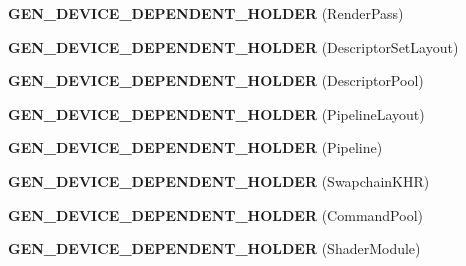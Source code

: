\begin{DoxyCompactItemize}
\item 
\mbox{\label{namespaceblaze_1_1vkw_aa8cd516cb33150db17cf3419e3564eb3}} 
{\bfseries G\+E\+N\+\_\+\+D\+E\+V\+I\+C\+E\+\_\+\+D\+E\+P\+E\+N\+D\+E\+N\+T\+\_\+\+H\+O\+L\+D\+ER} (Render\+Pass)
\item 
\mbox{\label{namespaceblaze_1_1vkw_a899f6acf3c1fea92c26320f7f0cbfdb0}} 
{\bfseries G\+E\+N\+\_\+\+D\+E\+V\+I\+C\+E\+\_\+\+D\+E\+P\+E\+N\+D\+E\+N\+T\+\_\+\+H\+O\+L\+D\+ER} (Descriptor\+Set\+Layout)
\item 
\mbox{\label{namespaceblaze_1_1vkw_a64c0355438819705ffd104379845f56d}} 
{\bfseries G\+E\+N\+\_\+\+D\+E\+V\+I\+C\+E\+\_\+\+D\+E\+P\+E\+N\+D\+E\+N\+T\+\_\+\+H\+O\+L\+D\+ER} (Descriptor\+Pool)
\item 
\mbox{\label{namespaceblaze_1_1vkw_a715373a505f77a1ed57492088afcb7d2}} 
{\bfseries G\+E\+N\+\_\+\+D\+E\+V\+I\+C\+E\+\_\+\+D\+E\+P\+E\+N\+D\+E\+N\+T\+\_\+\+H\+O\+L\+D\+ER} (Pipeline\+Layout)
\item 
\mbox{\label{namespaceblaze_1_1vkw_a15530c9419809463fec8545ddaeb2974}} 
{\bfseries G\+E\+N\+\_\+\+D\+E\+V\+I\+C\+E\+\_\+\+D\+E\+P\+E\+N\+D\+E\+N\+T\+\_\+\+H\+O\+L\+D\+ER} (Pipeline)
\item 
\mbox{\label{namespaceblaze_1_1vkw_a1a83ab9ab2acdcdc1186756457786ff0}} 
{\bfseries G\+E\+N\+\_\+\+D\+E\+V\+I\+C\+E\+\_\+\+D\+E\+P\+E\+N\+D\+E\+N\+T\+\_\+\+H\+O\+L\+D\+ER} (Swapchain\+K\+HR)
\item 
\mbox{\label{namespaceblaze_1_1vkw_a950d92e66c434bc9859e25787a2c3b1a}} 
{\bfseries G\+E\+N\+\_\+\+D\+E\+V\+I\+C\+E\+\_\+\+D\+E\+P\+E\+N\+D\+E\+N\+T\+\_\+\+H\+O\+L\+D\+ER} (Command\+Pool)
\item 
\mbox{\label{namespaceblaze_1_1vkw_a9fa2da45a50f49148b2bc71ea6ae4aba}} 
{\bfseries G\+E\+N\+\_\+\+D\+E\+V\+I\+C\+E\+\_\+\+D\+E\+P\+E\+N\+D\+E\+N\+T\+\_\+\+H\+O\+L\+D\+ER} (Shader\+Module)
\item 
\mbox{\label{namespaceblaze_1_1vkw_a4638146f40a04c1fbb5524e1babe21b7}} 

\end{DoxyCompactItemize}
